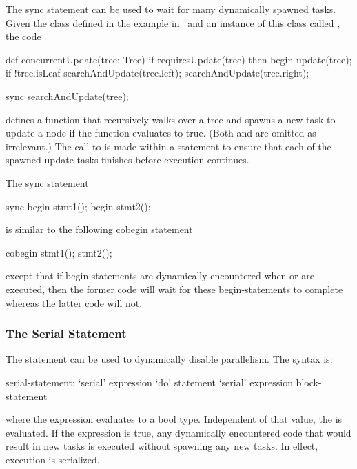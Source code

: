 \begin{example}
The sync statement can be used to wait for many dynamically spawned
tasks.  Given the  class defined in the example
in~ and an instance of this class
called , the code
\begin{chapel}
def concurrentUpdate(tree: Tree) {
  if requiresUpdate(tree) then
    begin update(tree);
  if !tree.isLeaf {
    searchAndUpdate(tree.left);
    searchAndUpdate(tree.right);
  }
}

sync searchAndUpdate(tree);
\end{chapel}
defines a function  that recursively walks over
a tree and spawns a new task to update a node if the
function  evaluates to true.
(Both  and  are omitted as
irrelevant.)  The call to  is made within
a  statement to ensure that each of the spawned update
tasks finishes before execution continues.
\end{example}

\begin{example}
The sync statement
\begin{chapel}
sync {
  begin stmt1();
  begin stmt2();
}
\end{chapel}
is similar to the following cobegin statement
\begin{chapel}
cobegin {
  stmt1();
  stmt2();
}
\end{chapel}
except that if begin-statements are dynamically encountered
when  or  are executed, then the former
code will wait for these begin-statements to complete whereas the
latter code will not.
\end{example}

\subsubsection{The Serial Statement}
\label{Serial}

The  statement can be used to dynamically disable
parallelism.  The syntax is:
\begin{syntax}
serial-statement:
  `serial' expression `do' statement
  `serial' expression block-statement
\end{syntax}
where the expression evaluates to a bool type.  Independent of that
value, the  is evaluated. If the expression is true,
any dynamically encountered code that would result in new tasks is
executed without spawning any new tasks.  In effect, execution is
serialized.

